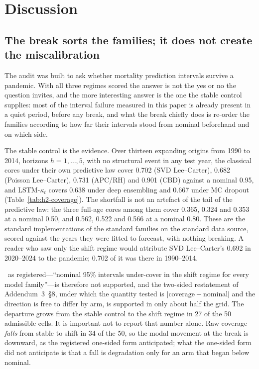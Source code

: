\section{Discussion}
\label{sec:discussion}

\subsection{The break sorts the families; it does not create the miscalibration}
\label{sec:discussion-standing}

The audit was built to ask whether mortality prediction intervals survive
a pandemic. With all three regimes scored the answer is not the yes or no
the question invites, and the more interesting answer is the one the
stable control supplies: most of the interval failure measured in this
paper is already present in a quiet period, before any break, and what
the break chiefly does is re-order the families according to how far
their intervals stood from nominal beforehand and on which side.

The stable control is the evidence. Over thirteen expanding origins from
1990 to 2014, horizons $h=1,\dots,5$, with no structural event in any
test year, the classical cores under their own predictive law cover
0.702 (SVD Lee--Carter), 0.682 (Poisson Lee--Carter), 0.731 (APC/RH) and
0.901 (CBD) against a nominal 0.95, and LSTM-$\kappa_t$ covers 0.638
under deep ensembling and 0.667 under MC dropout
(Table~\ref{tab:h2-coverage}). The shortfall is not an artefact of the
tail of the predictive law: the three full-age cores among them cover
0.365, 0.324 and 0.353 at a nominal 0.50, and 0.562, 0.522 and 0.566 at
a nominal 0.80. These are the standard implementations of
the standard families on the standard data source, scored against the
years they were fitted to forecast, with nothing breaking. A reader who
saw only the shift regime would attribute SVD Lee--Carter's 0.692 in
2020--2024 to the pandemic; 0.702 of it was there in 1990--2014.

\Htwo\ as registered---``nominal 95\% intervals under-cover in the shift
regime for every model family''---is therefore not supported, and the
two-sided restatement of Addendum~3~\S8, under which the quantity tested
is $|\text{coverage}-\text{nominal}|$ and the direction is free to differ
by arm, is supported in only about half the grid. The departure grows
from the stable control to the shift regime in 27 of the 50 admissible
cells. It is important not to report that number alone. Raw coverage
\emph{falls} from stable to shift in 34 of the 50, so the modal movement
at the break is downward, as the registered one-sided form anticipated;
what the one-sided form did not anticipate is that a fall is degradation
only for an arm that began below nominal.

